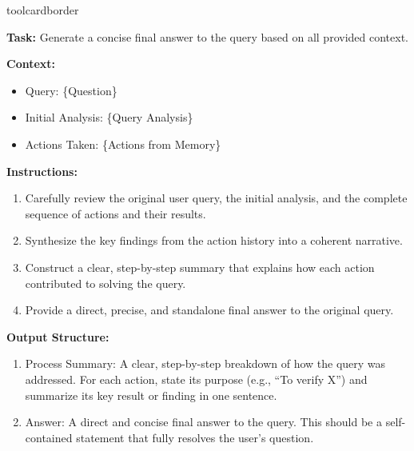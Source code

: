 \begin{custombox}[title=Instruction for {Solution Generator}]{toolcardborder}
\setlength{\parindent}{0pt}

\textbf{Task:} Generate a concise final answer to the query based on all provided context.

\vspace{6pt}

\noindent\textbf{Context:}
\begin{itemize}[left=0pt, label={}, itemsep=0pt, parsep=0pt]
 \item {Query:} {\{{Question}\}}
 
 \item {Initial Analysis:} {\{{Query Analysis}\}}
    
 \item {Actions Taken:} {\{{Actions} {from Memory}\}}
\end{itemize}

\vspace{6pt}

\noindent\textbf{Instructions:}
\begin{enumerate}[left=0pt, itemsep=0pt, parsep=0pt]
    \item Carefully review the original user query, the initial analysis, and the complete sequence of actions and their results.
    \item Synthesize the key findings from the action history into a coherent narrative.
    \item Construct a clear, step-by-step summary that explains how each action contributed to solving the query.
    \item Provide a direct, precise, and standalone final answer to the original query.
\end{enumerate}

\vspace{6pt}

\noindent\textbf{Output Structure:}
\begin{enumerate}[left=0pt, itemsep=0pt, parsep=0pt]
    \item {Process Summary:} A clear, step-by-step breakdown of how the query was addressed. For each action, state its purpose (e.g., ``To verify X'') and summarize its key result or finding in one sentence.
    \item {Answer:} A direct and concise final answer to the query. This should be a self-contained statement that fully resolves the user's question.
\end{enumerate}


\end{custombox}
